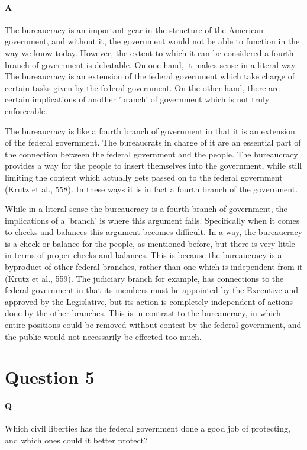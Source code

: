 \documentclass[12pt]{article}
\begin{document}
\paragraph{A}
The bureaucracy is an important gear in the structure of the American
government, and without it, the government would not be able to
function in the way we know today. However, the extent to which it can
be considered a fourth branch of government is debatable. On one hand,
it makes sense in a literal way. The bureaucracy is an extension of
the federal government which take charge of certain tasks given by the
federal government. On the other hand, there are certain implications
of another 'branch' of government which is not truly enforceable.
\par
The bureaucracy is like a fourth branch of government in that it is an
extension of the federal government. The bureaucrats in charge of it
are an essential part of the connection between the federal government
and the people. The bureaucracy provides a way for the people to
insert themselves into the government, while still limiting the
content which actually gets passed on to the federal government (Krutz
et al., 558). In these ways it is in fact a fourth branch of the
government.
\par
While in a literal sense the bureaucracy is a fourth branch of
government, the implications of a 'branch' is where this argument
fails. Specifically when it comes to checks and balances this argument
becomes difficult. In a way, the bureaucracy is a check or balance for
the people, as mentioned before, but there is very little in terms of
proper checks and balances. This is because the bureaucracy is a
byproduct of other federal branches, rather than one which is
independent from it (Krutz et al., 559). The judiciary branch for
example, has connections to the federal government in that its members
must be appointed by the Executive and approved by the Legislative,
but its action is completely independent of actions done by the other
branches. This is in contrast to the bureaucracy, in which entire
positions could be removed without contest by the federal government,
and the public would not necessarily be effected too much.
\section*{Question 5}
\paragraph{Q}
Which civil liberties has the federal government done a good job of protecting,
and which ones could it better protect?
\end{document}
